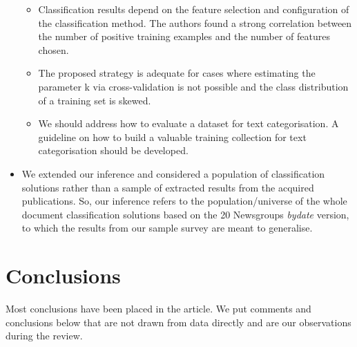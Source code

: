 \documentclass[
]{article}
\begin{document}
\begin{itemize}
\begin{itemize}
  \item
    Classification results depend on the feature selection and configuration of the classification method. The authors found a strong correlation between the number of positive training examples and the number of features chosen.
  \item
    The proposed strategy is adequate for cases where estimating the parameter k via cross-validation is not possible and the class distribution of a training set is skewed.
  \item
    We should address how to evaluate a dataset for text categorisation. A guideline on how to build a valuable training collection for text categorisation should be developed.
  \end{itemize}
\item
  We extended our inference and considered a population of classification solutions rather than a sample of extracted results from the acquired publications. So, our inference refers to the population/universe of the whole document classification solutions based on the 20 Newsgroups \emph{bydate} version, to which the results from our sample survey are meant to generalise.
\end{itemize}

\hypertarget{conclusions}{%
\section{Conclusions}\label{conclusions}}

Most conclusions have been placed in the article. We put comments and conclusions below that are not drawn from data directly and are our observations during the review.
\end{document}
